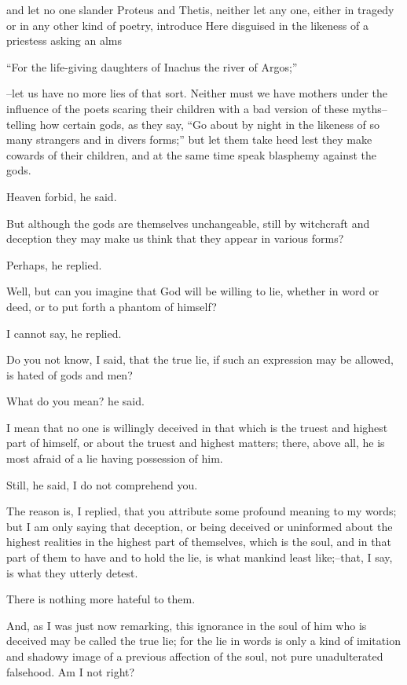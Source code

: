 and let no one slander Proteus and Thetis, neither let any one, either
in tragedy or in any other kind of poetry, introduce Here disguised in
the likeness of a priestess asking an alms

``For the life-giving daughters of Inachus the river of Argos;''

--let us have no more lies of that sort. Neither must we have mothers
under the influence of the poets scaring their children with a bad
version of these myths--telling how certain gods, as they say, ``Go about
by night in the likeness of so many strangers and in divers forms;'' but
let them take heed lest they make cowards of their children, and at the
same time speak blasphemy against the gods.

Heaven forbid, he said.

But although the gods are themselves unchangeable, still by witchcraft
and deception they may make us think that they appear in various forms?

Perhaps, he replied.

Well, but can you imagine that God will be willing to lie, whether in
word or deed, or to put forth a phantom of himself?

I cannot say, he replied.

Do you not know, I said, that the true lie, if such an expression may be
allowed, is hated of gods and men?

What do you mean? he said.

I mean that no one is willingly deceived in that which is the truest and
highest part of himself, or about the truest and highest matters; there,
above all, he is most afraid of a lie having possession of him.

Still, he said, I do not comprehend you.

The reason is, I replied, that you attribute some profound meaning to
my words; but I am only saying that deception, or being deceived
or uninformed about the highest realities in the highest part of
themselves, which is the soul, and in that part of them to have and to
hold the lie, is what mankind least like;--that, I say, is what they
utterly detest.

There is nothing more hateful to them.

And, as I was just now remarking, this ignorance in the soul of him who
is deceived may be called the true lie; for the lie in words is only a
kind of imitation and shadowy image of a previous affection of the soul,
not pure unadulterated falsehood. Am I not right?


